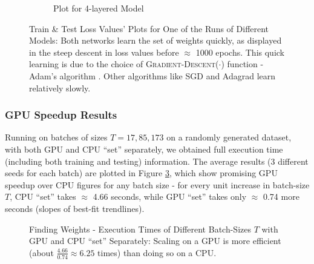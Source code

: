 \documentclass[12pt]{article}
\begin{document}
\begin{figure}[!htbp]
\begin{subfigure}{.49\textwidth}
            \caption{Plot for 4-layered Model}
            \label{fig:Plot for 4-layered Model}
        \end{subfigure}
        \caption[Train \& Test Loss Values' Plots for One of the Runs of Different Models]{Train \& Test Loss Values' Plots for One of the Runs of Different Models: Both networks learn the set of weights quickly, as displayed in the steep descent in loss values before $\approx$ 1000 epochs. This quick learning is due to the choice of \textsc{Gradient-Descent}($\cdot$) function - Adam's algorithm \cite{Adam}. Other algorithms like SGD \cite{SGD} and Adagrad \cite{Adagrad} learn relatively slowly.}
        \label{fig:Train & Test Loss Values' Plots of Different Models}
    \end{figure}

    \subsubsection{GPU Speedup Results}
    Running on batches of sizes $T = 17, 85, 173$ on a randomly generated dataset, with both GPU and CPU ``set'' separately, we obtained full  execution time (including both training and testing) information. The average results (3 different seeds for each batch) are plotted in Figure \ref{fig:Execution Times of Different Batch-Sizes with GPU and CPU ``set'' Separately}, which show promising GPU speedup over CPU figures for any batch size - for every unit increase in batch-size $T$, CPU ``set'' takes $\approx$ 4.66 seconds, while GPU ``set'' takes only $\approx$ 0.74 more seconds (slopes of best-fit trendlines).
    \begin{figure}[!htbp]
        \centering
        \caption[Finding Weights - Execution Times of Different Batch-Sizes $T$ with GPU and CPU ``set'' Separately]{Finding Weights - Execution Times of Different Batch-Sizes $T$ with GPU and CPU ``set'' Separately: Scaling on a GPU is more efficient (about $\frac{4.66}{0.74} \approx 6.25$ times) than doing so on a CPU.}
        \label{fig:Execution Times of Different Batch-Sizes with GPU and CPU ``set'' Separately}
    \end{figure}
\end{document}
